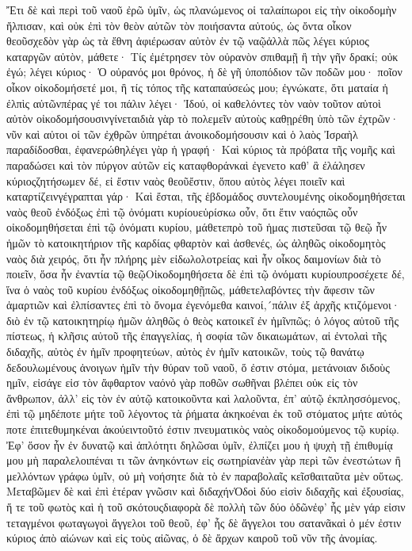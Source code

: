 Ἔτι δὲ καὶ περὶ τοῦ ναοῦ ἐρῶ ὑμῖν, ὡς πλανώμενος οἱ ταλαίπωροι εἰς τὴν οἰκοδομὴν ἤλπισαν, καὶ οὐκ ἐπὶ τὸν θεὸν αὐτῶν τὸν ποιήσαντα αὐτούς, ὡς ὄντα οἶκον θεοῦσχεδὸν γὰρ ὡς τὰ ἔθνη ἀφιέρωσαν αὐτὸν ἐν τῷ ναῷἀλλὰ πῶς λέγει κύριος καταργῶν αὐτὸν, μάθετε· Τίς ἐμέτρησεν τὸν οὐρανὸν σπιθαμῇ ἢ τὴν γῆν δρακί; οὐκ ἐγώ; λέγει κύριος· Ὁ οὐρανός μοι θρόνος, ἡ δὲ γῆ ὑποπόδιον τῶν ποδῶν μου· ποῖον οἶκον οἰκοδομήσετέ μοι, ἢ τίς τόπος τῆς καταπαύσεώς μου; ἐγνώκατε, ὅτι ματαία ἡ ἐλπὶς αὐτῶνπέρας γέ τοι πάλιν λέγει· Ἰδού, οἱ καθελόντες τὸν ναὸν τοῦτον αὐτοὶ αὐτὸν οἰκοδομήσουσινγίνεταιδιὰ γὰρ τὸ πολεμεῖν αὐτοὺς καθῃρέθη ὑπὸ τῶν ἐχτρῶν· νῦν καὶ αὐτοι οἱ τῶν ἐχθρῶν ὑπηρέται ἀνοικοδομήσουσιν καὶ ὁ λαὸς Ἰσραὴλ παραδίδοσθαι, ἐφανερώθηλέγει γὰρ ἡ γραφή· Καὶ κύριος τὰ πρόβατα τῆς νομῆς καὶ παραδώσει καὶ τὸν πύργον αὐτῶν εἰς καταφθοράνκαὶ ἐγενετο καθ’ ἃ ἐλάλησεν κύριοςζητήσωμεν δέ, εἰ ἔστιν ναὸς θεοῦἔστιν, ὅπου αὐτὸς λέγει ποιεῖν καὶ καταρτίζεινγέγραπται γάρ· Καὶ ἔσται, τῆς ἑβδομάδος συντελουμένης οἰκοδομηθήσεται ναὸς θεοῦ ἐνδόξως ἐπὶ τῷ ὀνόματι κυρίουεὑρίσκω οὖν, ὅτι ἔτιν ναόςπῶς οὖν οἰκοδομηθήσεται ἐπὶ τῷ ὀνόματι κυρίου, μάθετεπρὸ τοῦ ἡμας πιστεῦσαι τῷ θεῷ ἦν ἡμῶν τὸ κατοικητήριον τῆς καρδίας φθαρτὸν καὶ ἀσθενές, ὡς ἀληθῶς οἰκοδομητὸς ναὸς διὰ χειρός, ὅτι ἦν πλήρης μὲν εἰδωλολοτρείας καὶ ἦν οἶκος δαιμονίων διὰ τὸ ποιεῖν, ὅσα ἦν ἐναντία τῷ θεῷΟἰκοδομηθήσετα δὲ ἐπὶ τῷ ὀνόματι κυρίουπροσέχετε δέ, ἵνα ὁ ναὸς τοῦ κυρίου ἐνδόξως οἰκοδομηθῇπῶς, μάθετελαβόντες τὴν ἄφεσιν τῶν ἁμαρτιῶν καὶ ἐλπίσαντες ἐπὶ τὸ ὄνομα ἐγενόμεθα καινοί,´πάλιν ἐξ ἀρχῆς κτιζόμενοι· διὸ ἐν τῷ κατοικητηρίῳ ἡμῶν ἀληθῶς ὁ θεὸς κατοικεῖ ἐν ἡμῖνπῶς; ὁ λόγος αὐτοῦ τῆς πίστεως, ἡ κλῆσις αὐτοῦ τῆς ἐπαγγελίας, ἡ σοφία τῶν δικαιωμάτων, αἱ ἐντολαὶ τῆς διδαχῆς, αὐτὸς ἐν ἡμῖν προφητεύων, αὐτὸς ἐν ἡμῖν κατοικῶν, τοὺς τῷ θανάτῳ δεδουλωμένους ἀνοιγων ἡμῖν τὴν θύραν τοῦ ναοῦ, ὅ ἐστιν στόμα, μετάνοιαν διδοὺς ημῖν, εἰσάγε εἰσ τὸν ἄφθαρτον ναόνὁ γὰρ ποθῶν σωθῆναι βλέπει οὐκ εἰς τὸν ἄνθρωπον, ἀλλ’ εἰς τὸν ἐν αὐτῷ κατοικοῦντα καὶ λαλοῦντα, ἐπ’ αὐτῷ ἐκπλησσόμενος, ἐπὶ τῷ μηδέποτε μήτε τοῦ λέγοντος τὰ ῥήματα ἀκηκοέναι ἐκ τοῦ στόματος μήτε αὐτός ποτε ἐπιτεθυμηκέναι ἀκούειντοῦτό ἐστιν πνευματικὸς ναὸς οἰκοδομούμενος τῷ κυρίῳ.
Ἐφ’ ὅσον ἦν ἐν δυνατῷ καὶ ἁπλότητι δηλῶσαι ὑμῖν, ἐλπίζει μου ἡ ψυχὴ τῇ ἐπιθυμίᾳ μου μὴ παραλελοιπέναι τι τῶν ἀνηκόντων εἰς σωτηρίανἐὰν γὰρ περὶ τῶν ἐνεστώτων ἢ μελλόντων γράφω ὑμῖν, οὐ μὴ νοήσητε διὰ τὸ ἐν παραβολαῖς κεῖσθαιταῦτα μὲν οὕτως.
Μεταβῶμεν δὲ καὶ ἐπὶ ἑτέραν γνῶσιν καὶ διδαχήνὉδοὶ δύο εἰσὶν διδαχῆς καὶ ἐξουσίας, ἥ τε τοῦ φωτὸς καὶ ἡ τοῦ σκότουςδιαφορὰ δὲ πολλὴ τῶν δύο ὁδῶνἐφ’ ἧς μὲν γάρ εἰσιν τεταγμένοι φωταγωγοὶ ἄγγελοι τοῦ θεοῦ, ἐφ’ ἧς δὲ ἄγγελοι του σατανᾶκαὶ ὁ μέν ἐστιν κύριος ἀπὸ αἰώνων καὶ εἰς τοὺς αἰῶνας, ὁ δὲ ἄρχων καιροῦ τοῦ νῦν τῆς ἀνομίας.
